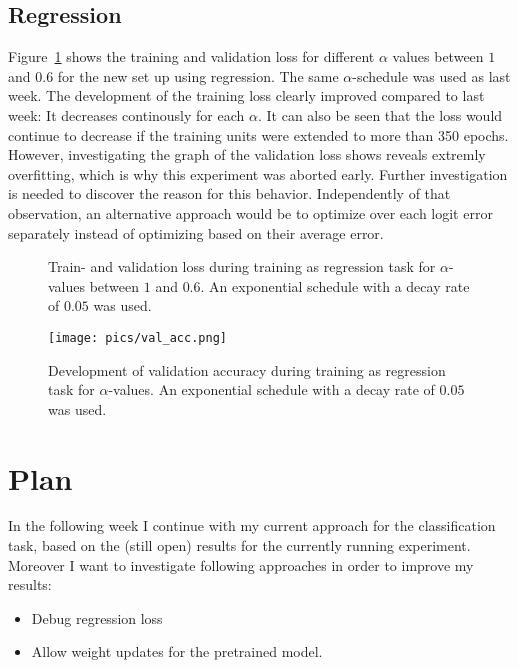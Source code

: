 \documentclass[10pt,twocolumn,letterpaper]{article}
\begin{document}
\subsection{Regression}
Figure~\ref{fig:loss_regression} shows the training and validation loss for different $\alpha$ values between $1$ and $0.6$ for the new set up using regression.
The same $\alpha$-schedule was used as last week.
The development of the training loss clearly improved compared to last week:
It decreases continously for each $\alpha$.
It can also be seen that the loss would continue to decrease if the training units were extended to more than 350 epochs.
However, investigating the graph of the validation loss shows reveals extremly overfitting, which is why this experiment was aborted early.
Further investigation is needed to discover the reason for this behavior.
Independently of that observation, an alternative approach would be to optimize over each logit error separately instead of optimizing based on their average error.
\begin{figure}[hpbt]
	\centering
	\hspace{0.1\textwidth}
	\caption[]{Train- and validation loss during training as regression task for $\alpha$-values between $1$ and $0.6$.
	An exponential schedule with a decay rate of $0.05$ was used.}
	\label{fig:loss_regression}
\end{figure}
\begin{figure}[hpbt]
	\centering
	\texttt{[image: pics/val\_acc.png]}
	\caption[]{Development of validation accuracy during training as regression task for $\alpha$-values.
	An exponential schedule with a decay rate of $0.05$ was used.}
	\label{fig:val_acc_regression}
\end{figure}

\section{Plan}
In the following week I continue with my current approach for the classification task, based on the (still open) results for the currently running experiment.
Moreover I want to investigate following approaches in order to improve my results:
\begin{itemize}
	\item Debug regression loss
	\item Allow weight updates for the pretrained model.
\end{itemize}

{\small


}
\end{document}
